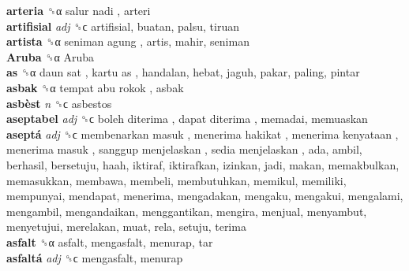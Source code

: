 \textbf{arteria} ␝α   salur nadi , arteri  \\
\textbf{artifisial} \emph{adj}  ␝ϲ  artifisial, buatan, palsu, tiruan  \\
\textbf{artista} ␝α   seniman agung , artis, mahir, seniman  \\
\textbf{Aruba} ␝α   Aruba   \\
\textbf{as} ␝α   daun sat ,  kartu as , handalan, hebat, jaguh, pakar, paling, pintar  \\
\textbf{asbak} ␝α   tempat abu rokok , asbak  \\
\textbf{asbèst} \emph{n}  ␝ϲ  asbestos  \\
\textbf{aseptabel} \emph{adj}  ␝ϲ   boleh diterima ,  dapat diterima , memadai, memuaskan  \\
\textbf{aseptá} \emph{adj}  ␝ϲ   membenarkan masuk ,  menerima hakikat ,  menerima kenyataan ,  menerima masuk ,  sanggup menjelaskan ,  sedia menjelaskan , ada, ambil, berhasil, bersetuju, haah, iktiraf, iktirafkan, izinkan, jadi, makan, memakbulkan, memasukkan, membawa, membeli, membutuhkan, memikul, memiliki, mempunyai, mendapat, menerima, mengadakan, mengaku, mengakui, mengalami, mengambil, mengandaikan, menggantikan, mengira, menjual, menyambut, menyetujui, merelakan, muat, rela, setuju, terima  \\
\textbf{asfalt} ␝α  asfalt, mengasfalt, menurap, tar  \\
\textbf{asfaltá} \emph{adj}  ␝ϲ  mengasfalt, menurap  \\
